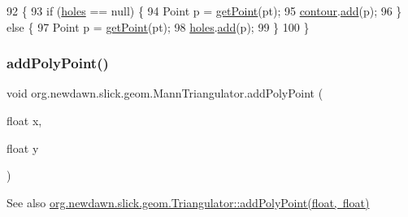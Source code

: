 \begin{DoxyCode}
92                                        \{
93         \textcolor{keywordflow}{if} (\mbox{\hyperlink{classorg_1_1newdawn_1_1slick_1_1geom_1_1_mann_triangulator_a52a9b8b72ebce44c620dbad2e8285540}{holes}} == null) \{
94             Point p = \mbox{\hyperlink{classorg_1_1newdawn_1_1slick_1_1geom_1_1_mann_triangulator_aaeb702ea8e30747148abb637eb7cc342}{getPoint}}(pt);
95             \mbox{\hyperlink{classorg_1_1newdawn_1_1slick_1_1geom_1_1_mann_triangulator_a94eff0c5ad39ce0c232815591fe3f2d8}{contour}}.\mbox{\hyperlink{classorg_1_1newdawn_1_1slick_1_1geom_1_1_mann_triangulator_1_1_point_bag_a7af185327fa10df11a02cf2f1fe6dcd4}{add}}(p);
96         \} \textcolor{keywordflow}{else} \{
97             Point p = \mbox{\hyperlink{classorg_1_1newdawn_1_1slick_1_1geom_1_1_mann_triangulator_aaeb702ea8e30747148abb637eb7cc342}{getPoint}}(pt);
98             \mbox{\hyperlink{classorg_1_1newdawn_1_1slick_1_1geom_1_1_mann_triangulator_a52a9b8b72ebce44c620dbad2e8285540}{holes}}.\mbox{\hyperlink{classorg_1_1newdawn_1_1slick_1_1geom_1_1_mann_triangulator_1_1_point_bag_a7af185327fa10df11a02cf2f1fe6dcd4}{add}}(p);
99         \}
100     \}
\end{DoxyCode}
\mbox{\label{classorg_1_1newdawn_1_1slick_1_1geom_1_1_mann_triangulator_a411808c4fa26392c69dc6c6d370f8b9e}} 
\subsubsection{\texorpdfstring{add\+Poly\+Point()}{addPolyPoint()}}
{\footnotesize\ttfamily void org.\+newdawn.\+slick.\+geom.\+Mann\+Triangulator.\+add\+Poly\+Point (\begin{DoxyParamCaption}\item[{float}]{x,  }\item[{float}]{y }\end{DoxyParamCaption})\hspace{0.3cm}{\ttfamily [inline]}}

\begin{DoxySeeAlso}{See also}
\mbox{\hyperlink{interfaceorg_1_1newdawn_1_1slick_1_1geom_1_1_triangulator_a32b11eccb582c7f4993a944df0b1db65}{org.\+newdawn.\+slick.\+geom.\+Triangulator\+::add\+Poly\+Point(float, float)}} 
\end{DoxySeeAlso}


